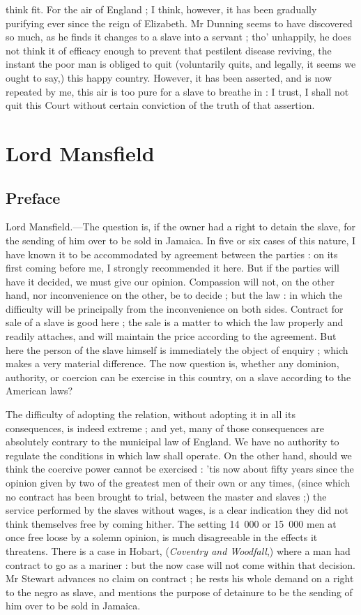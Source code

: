 \documentclass[a4paper]{article}
\begin{document}
think fit. For the air of England ; I think, however, it has been gradually purifying ever since the reign of Elizabeth. Mr Dunning seems to have discovered so much, as he finds it changes to a slave into a servant ; tho' unhappily, he does not think it of efficacy enough to prevent that pestilent disease reviving, the instant the poor man is obliged to quit (voluntarily quits, and legally, it seems we ought to say,) this happy country. However, it has been asserted, and is now repeated by me, this air is too pure for a slave to breathe in : I trust, I shall not quit this Court without certain conviction of the truth of that assertion.

\section{Lord Mansfield}
\subsection{Preface}
Lord Mansfield.---The question is, if the owner had a right to detain the slave, for the sending of him over to be sold in Jamaica. In five or six cases of this nature, I have known it to be accommodated by agreement between the parties : on its first coming before me, I strongly recommended it here. But if the parties will have it decided, we must give our opinion. Compassion will not, on the other hand, nor inconvenience on the other, be to decide ; but the law : in which the difficulty will be principally from the inconvenience on both sides. Contract for sale of a slave is good here ; the sale is a matter to which the law properly and readily attaches, and will maintain the price according to the agreement. But here the person of the slave himself is immediately the object of enquiry ; which makes a very material difference. The now question is, whether any dominion, authority, or coercion can be exercise in this country, on a slave according to the American laws? 

The difficulty of adopting the relation, without adopting it in all its consequences, is indeed extreme ; and yet, many of those consequences are absolutely contrary to the municipal law of England. We have no authority to regulate the conditions in which law shall operate. On the other hand, should we think the coercive power cannot be exercised : 'tis now about fifty years since the opinion given by two of the greatest men of their own or any times, (since which no contract has been brought to trial, between the master and slaves ;) the service performed by the slaves without wages, is a clear indication they did not think themselves free by coming hither. The setting 14~000 or 15~000 men at once free loose by a solemn opinion, is much disagreeable in the effects it threatens. There is a case in Hobart, (\emph{Coventry and Woodfall},) where a man had contract to go as a mariner : but the now case will not come within that decision. Mr Stewart advances no claim on contract ; he rests his whole demand on a right to the negro as slave, and mentions the purpose of detainure to be the sending of him over to be sold in Jamaica. 
\end{document}
